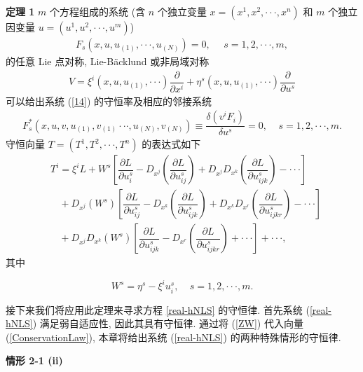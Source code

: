 \textbf{定理 1} $m$ 个方程组成的系统 (含 $n$ 个独立变量 $x=(x^1, x^2, \cdot\cdot\cdot, x^n)$ 和 $m$ 个独立因变量 $u=(u^1, u^2, \cdot\cdot\cdot, u^m)$)
\begin{align}
F_{s}(x, u, u_{(1)},\cdot\cdot\cdot, u_{(N)})=0,  ~~~~~~s=1,2,\cdot\cdot\cdot,m, \label{14}
\end{align}
的任意 Lie 点对称, Lie-B\"{a}cklund 或非局域对称
\begin{align}
V=\xi^{i}(x, u, u_{(1)},\cdot\cdot\cdot )\dfrac{\partial}{\partial x^i}+\eta^s(x, u, u_{(1)},\cdot\cdot\cdot)\dfrac{\partial}{\partial u^s}
\end{align}
可以给出系统 (\ref{14}) 的守恒率及相应的邻接系统
\begin{align}
F_{s}^{*}(x, u, v, u_{(1)}, v_{(1)}\cdot\cdot\cdot, u_{(N)}, v_{(N)})\equiv \dfrac{\delta (v^i F_i )}{\delta u^s}=0, ~~~~~s=1,2,\cdot\cdot\cdot,m.
\end{align}
守恒向量 $T=(T^1, T^2, \cdot\cdot\cdot, T^n)$ 的表达式如下
\begin{equation}\label{ConservationLaw}
\begin{aligned}
&T^i=\xi^i L+W^s [\dfrac{\partial L}{\partial u_i^s}-D_{x^j}(\dfrac{\partial L}{\partial u_{ij}^s})+D_{x^j}D_{x^k}(\dfrac{\partial L}{\partial u_{ijk}^s})-\cdot\cdot\cdot]\\
&~~~~+D_{x^j}(W^s)[\dfrac{\partial L}{\partial u_{ij}^s}-D_{x^k}(\dfrac{\partial L}{\partial u_{ijk}^s})+D_{x^k}D_{x^r}(\dfrac{\partial L}{\partial u_{ijkr}^s})-\cdot\cdot\cdot]\\
&~~~~ +D_{x^j}D_{x^k}(W^s)[\dfrac{\partial L}{\partial u_{ijk}^s}-D_{x^r}(\dfrac{\partial L}{\partial u_{ijkr}^s})+\cdot\cdot\cdot]+\cdot\cdot\cdot,
\end{aligned}
\end{equation}
其中

\begin{equation}
W^s=\eta^s-\xi^i u_i^s, ~~~~~s=1,2,\cdot\cdot\cdot, m.
\end{equation}

接下来我们将应用此定理来寻求方程 \eqref{real-hNLS} 的守恒律. 首先系统 (\ref{real-hNLS}) 满足弱自适应性, 因此其具有守恒律. 通过将 (\ref{ZW}) 代入向量 (\ref{ConservationLaw}), 本章将给出系统 (\ref{real-hNLS}) 的两种特殊情形的守恒律.

\noindent \textbf{情形 2-1 (ii)}

